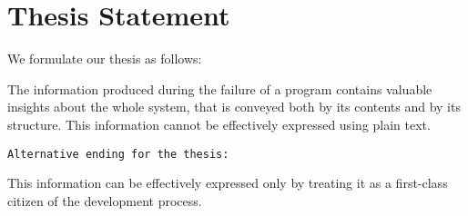 

\section{Thesis Statement}\label{sec:thesis}

We formulate our thesis as follows:

\begin{framed}
The information produced during the failure of a program contains valuable insights about the whole system, that is conveyed both by its contents and by its structure.
This information cannot be effectively expressed using plain text.
\end{framed}

\texttt{Alternative ending for the thesis:}
\begin{framed}
This information can be effectively expressed only by treating it as a first-class citizen of the development process.
\end{framed}










